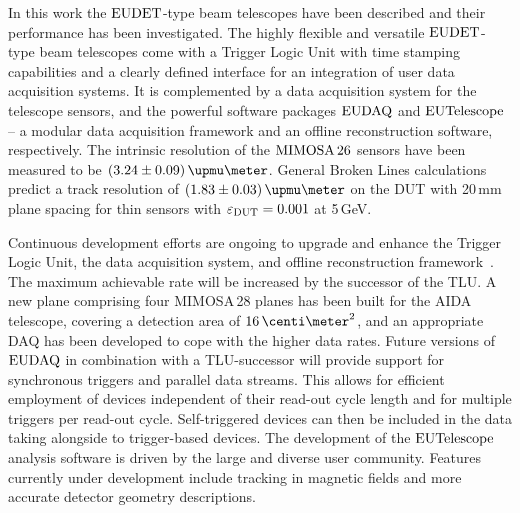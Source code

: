 

In this work the $\textrm{EUDET}$-type beam telescopes have been described and their performance has been investigated. 
The highly flexible and versatile $\textrm{EUDET}$-type beam telescopes come with a Trigger Logic Unit with time stamping capabilities and a clearly defined interface for an integration of user data acquisition systems.
It is complemented by a data acquisition system for the telescope sensors, and the powerful software packages $\textrm{EUDAQ}$ and $\textrm{EUTelescope}$
 --  a modular data acquisition framework and an offline reconstruction software, respectively. 
The intrinsic resolution of the $\textrm{MIMOSA\,26}$ sensors have been measured to be $(3.24 \pm 0.09)\,\upmu\meter$.
General Broken Lines calculations predict a track resolution of $(1.83 \pm 0.03)\,\upmu\meter$ on the DUT with 20\,mm plane spacing for thin sensors with $\mathnormal{\varepsilon_{\textrm{DUT}}} = 0.001$ at 5\,GeV. 

Continuous development efforts are ongoing to upgrade and enhance the Trigger Logic Unit, the data acquisition system, and offline reconstruction framework~\cite{ref:tipp2014_eudaq}.  
The maximum achievable rate will be increased by the successor of the TLU. 
A new plane comprising four MIMOSA\,28 planes has been built for the AIDA telescope, covering a detection area of $16\,\centi\meter^2$, and an appropriate DAQ has been developed to cope with the higher data rates. 
Future versions of $\textrm{EUDAQ}$ in combination with a TLU-successor will provide support for synchronous triggers and parallel data streams. 
This allows for efficient employment of devices independent of their read-out cycle length and for multiple triggers per read-out cycle. 
Self-triggered devices can then be included in the data taking alongside to trigger-based devices. 
The development of the $\textrm{EUTelescope}$ analysis software is driven by the large and diverse user community. 
Features currently under development include tracking in magnetic fields and more accurate detector geometry descriptions. 
